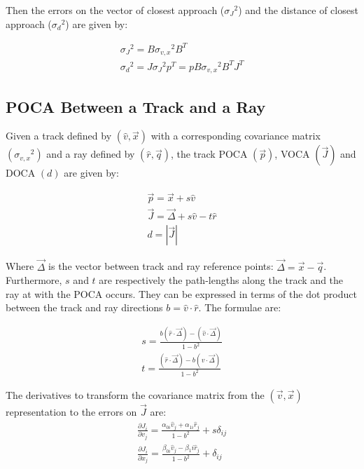 \documentclass[fleqn,twoside,draft]{article}
\begin{document}
Then the errors on the vector of closest approach (${\sigma_{J}}^2$) and the distance of closest approach (${\sigma_{d}}^2$) are given by:

\begin{subequations}
\begin{gather}
  {\sigma_{J}}^2 =  B {\sigma_{v,x}}^2 B^{T} \\
  {\sigma_{d}}^2 =  J {\sigma_{J}}^2 p^T = p B {\sigma_{v,x}}^2 B^{T} J^T 
\end{gather}
\end{subequations}



\subsection{POCA Between a Track and a Ray}

Given a track defined by $(\hat{v},\vec{x})$ with a corresponding covariance matrix $({\sigma_{v,x}}^2)$ and a ray defined by $(\hat{r},\vec{q})$, the track POCA $(\vec{p})$, VOCA $(\vec{J})$ and DOCA $(d)$ are given by:

\begin{subequations}
\begin{gather}
  \vec{p} = \vec{x} + s \hat{v} \\
  \vec{J} = \vec{\Delta} + s \hat{v} - t \hat{r} \\
  d = |\vec{J}| 
\end{gather}
\end{subequations}

Where $\vec{\Delta}$ is the vector between track and ray reference points: $\vec{\Delta} = \vec{x} - \vec{q}$.  Furthermore, $s$ and $t$ are respectively the path-lengths along the track and the ray at with the POCA occurs.  They can be expressed in terms of the dot product between the track and ray directions $b = \hat{v} \cdot \hat{r}$.  The formulae are:

\begin{subequations}
\begin{gather}
  s = \frac{ b (\hat{r} \cdot \vec{\Delta}) - (\hat{v} \cdot \vec{\Delta})}{ 1 - b^2 } \\
  t = \frac{ (\hat{r} \cdot \vec{\Delta}) - b (\hat{v} \cdot \vec{\Delta})}{ 1 - b^2 } 
\end{gather}
\end{subequations}

The derivatives to transform the covariance matrix from the $(\vec{v},\vec{x})$ representation to the errors on $\vec{J}$ are:
\begin{subequations}
\begin{gather}
  \frac{\partial J_{i}}{\partial v_{j}} = \frac{ \alpha_{0i} \hat{v}_j + \alpha_{1i} \hat{r}_j}{ 1 - b^2 } 
                                        + s \delta_{ij} \\
  \frac{\partial J_{i}}{\partial x_{j}} = \frac{ \beta_{0i} \hat{v}_j - \beta{_1i} \hat{r}_j}{ 1 - b^2 } 
                                        + \delta_{ij} 
\end{gather}
\end{subequations}
\end{document}
